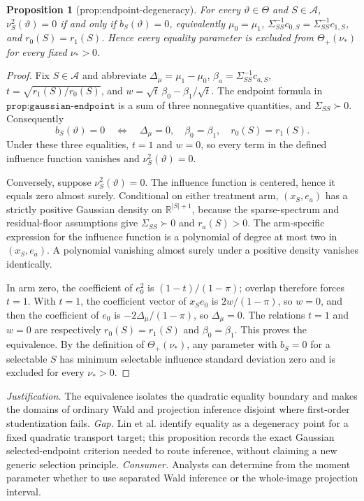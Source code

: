 \documentclass{article}
\newtheorem{proposition}{Proposition}
\begin{document}
\begin{proposition}[prop:endpoint-degeneracy]\label{prop:endpoint-degeneracy}
For every \(\vartheta\in\Theta\) and \(S\in\mathcal A\), \(\nu_S^2(\vartheta)=0\) if and only if \(b_S(\vartheta)=0\), equivalently \(\mu_0=\mu_1\), \(\Sigma_{SS}^{-1}c_{0,S}=\Sigma_{SS}^{-1}c_{1,S}\), and \(r_0(S)=r_1(S)\). Hence every equality parameter is excluded from \(\Theta_+(\nu_*)\) for every fixed \(\nu_*>0\).
\end{proposition}
\begin{proof}
Fix \(S\in\mathcal A\) and abbreviate
\(\Delta_\mu=\mu_1-\mu_0\), \(\beta_a=\Sigma_{SS}^{-1}c_{a,S}\),
\(t=\sqrt{r_1(S)/r_0(S)}\), and
\(w=\sqrt t\,\beta_0-\beta_1/\sqrt t\).  The endpoint formula in
\(\texttt{prop:gaussian-endpoint}\) is a sum of three nonnegative quantities, and \(\Sigma_{SS}\succ0\).  Consequently
\[
 b_S(\vartheta)=0
 \quad\Longleftrightarrow\quad
 \Delta_\mu=0,\quad \beta_0=\beta_1,\quad r_0(S)=r_1(S).
\]
Under these three equalities, \(t=1\) and \(w=0\), so every term in the defined influence function vanishes and \(\nu_S^2(\vartheta)=0\).

Conversely, suppose \(\nu_S^2(\vartheta)=0\).  The influence function is centered, hence it equals zero almost surely.  Conditional on either treatment arm, \((x_S,e_a)\) has a strictly positive Gaussian density on \(\mathbb R^{|S|+1}\), because the sparse-spectrum and residual-floor assumptions give \(\Sigma_{SS}\succ0\) and \(r_a(S)>0\).  The arm-specific expression for the influence function is a polynomial of degree at most two in \((x_S,e_a)\).  A polynomial vanishing almost surely under a positive density vanishes identically.

In arm zero, the coefficient of \(e_0^2\) is \((1-t)/(1-\pi)\); overlap therefore forces \(t=1\).  With \(t=1\), the coefficient vector of \(x_Se_0\) is \(2w/(1-\pi)\), so \(w=0\), and then the coefficient of \(e_0\) is \(-2\Delta_\mu/(1-\pi)\), so \(\Delta_\mu=0\).  The relations \(t=1\) and \(w=0\) are respectively \(r_0(S)=r_1(S)\) and \(\beta_0=\beta_1\).  This proves the equivalence.  By the definition of \(\Theta_+(\nu_*)\), any parameter with \(b_S=0\) for a selectable \(S\) has minimum selectable influence standard deviation zero and is excluded for every \(\nu_*>0\).
\end{proof}
\par\smallskip\noindent \textit{Justification.} The equivalence isolates the quadratic equality boundary and makes the domains of ordinary Wald and projection inference disjoint where first-order studentization fails. \textit{Gap.} Lin et al. identify equality as a degeneracy point for a fixed quadratic transport target; this proposition records the exact Gaussian selected-endpoint criterion needed to route inference, without claiming a new generic selection principle. \textit{Consumer.} Analysts can determine from the moment parameter whether to use separated Wald inference or the whole-image projection interval.
\end{document}
